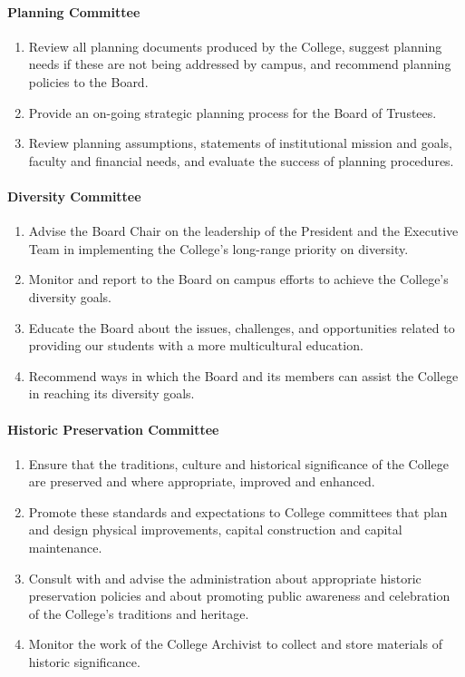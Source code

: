 \documentclass[letterpaper, 11pt]{article}
\begin{document}
			\paragraph{Planning Committee}
				\begin{enumerate}
					\item{Review all planning documents produced by the College, suggest planning needs if these are not being addressed by campus, and recommend planning policies to the Board.}
					\item{Provide an on-going strategic planning process for the Board of Trustees.}
					\item{Review planning assumptions, statements of institutional mission and goals, faculty and financial needs, and evaluate the success of planning procedures.}
				\end{enumerate}
			\paragraph{Diversity Committee}
				\begin{enumerate}
					\item{Advise the Board Chair on the leadership of the President and the Executive Team in implementing the College's long-range priority on diversity.}
					\item{Monitor and report to the Board on campus efforts to achieve the College's diversity goals.}
					\item{Educate the Board about the issues, challenges, and opportunities related to providing our students with a more multicultural education.}
					\item{Recommend ways in which the Board and its members can assist the College in reaching its diversity goals.}
				\end{enumerate}
			\paragraph{Historic Preservation Committee}
				\begin{enumerate}
					\item{Ensure that the traditions, culture and historical significance of the College are preserved and where appropriate, improved and enhanced.}
					\item{Promote these standards and expectations to College committees that plan and design physical improvements, capital construction and capital maintenance.}
					\item{Consult with and advise the administration about appropriate historic preservation policies and about promoting public awareness and celebration of the College's traditions and heritage.}
					\item{Monitor the work of the College Archivist to collect and store materials of historic significance.}
				\end{enumerate}
\end{document}
